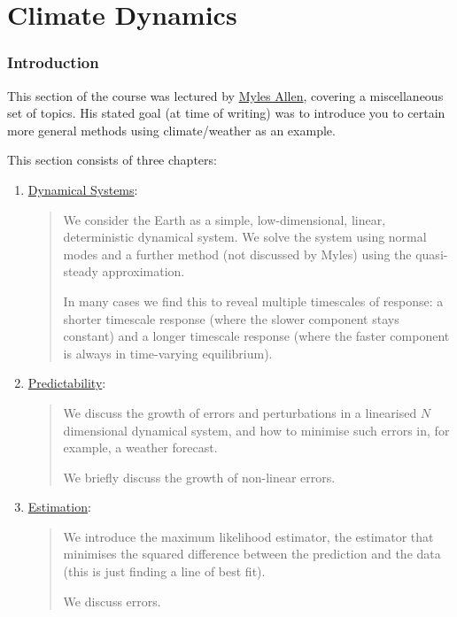 \part{Climate Dynamics}\label{Climate Dynamics}

\section*{Introduction}

This section of the course was lectured by \href{https://www.physics.ox.ac.uk/our-people/allenm}{Myles Allen}, covering a miscellaneous set of topics. His stated goal (at time of writing) was to introduce you to certain more general methods using climate/weather as an example. \vspace{5 mm}

\noindent This section consists of three chapters:\vspace{5 mm}

\begin{enumerate}
    \item \hyperref[Dynamical Systems]{Dynamical Systems}: 
        
        \begin{quote}
            We consider the Earth as a simple, low-dimensional, linear, deterministic dynamical system. We solve the system using normal modes and a further method (not discussed by Myles) using the quasi-steady approximation.

            In many cases we find this to reveal multiple timescales of response: a shorter timescale response (where the slower component stays constant) and a longer timescale response (where the faster component is always in time-varying equilibrium).
        \end{quote}

    \item \hyperref[Predictability]{Predictability}: 
    
        \begin{quote}
            We discuss the growth of errors and perturbations in a linearised $N$ dimensional dynamical system, and how to minimise such errors in, for example, a weather forecast.

            We briefly discuss the growth of non-linear errors.
        \end{quote}
    
    \item \hyperref[Estimation]{Estimation}:
        
        \begin{quote}
            We introduce the maximum likelihood estimator, the estimator that minimises the squared difference between the prediction and the data (this is just finding a line of best fit).

            We discuss errors.
        \end{quote}
\end{enumerate}

